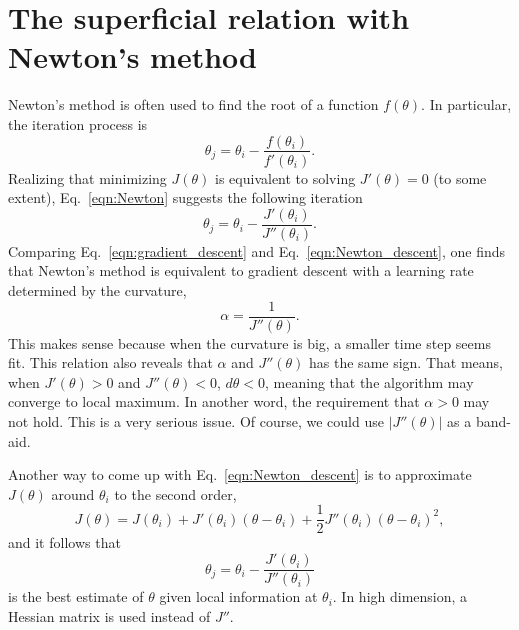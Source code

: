 \section{The superficial relation with Newton's method}
Newton's method is often used to find the root of a function $f(\theta)$. In particular, the iteration process is
\begin{equation}
\theta_j = \theta_i - \frac{f(\theta_i)}{f'(\theta_i)}.\label{eqn:Newton}
\end{equation}
Realizing that minimizing $J(\theta)$ is equivalent to solving $J'(\theta) = 0$ (to some extent), Eq.~\ref{eqn:Newton} suggests the following iteration
\begin{equation}
\theta_j = \theta_i - \frac{J'(\theta_i)}{J''(\theta_i)}.\label{eqn:Newton_descent}
\end{equation}
Comparing Eq.~\ref{eqn:gradient_descent} and Eq.~\ref{eqn:Newton_descent}, one finds that Newton's method is equivalent to gradient descent with a learning rate determined by the curvature,
\begin{equation}
\alpha = \frac{1}{J''(\theta)}.
\end{equation}
This makes sense because when the curvature is big, a smaller time step seems fit. This relation also reveals that $\alpha$ and $J''(\theta)$ has the same sign. That means, when $J'(\theta)>0$ and $J''(\theta)<0$, $d\theta<0$, meaning that the algorithm may converge to local maximum. In another word, the requirement that $\alpha > 0$ may not hold. This is a very serious issue. Of course, we could use $|J''(\theta)|$ as a band-aid. 

Another way to come up with Eq.~\ref{eqn:Newton_descent} is to approximate $J(\theta)$ around $\theta_i$ to the second order,
\begin{equation}
J(\theta) = J(\theta_i) + J'(\theta_i)(\theta-\theta_i) + \frac{1}{2}J''(\theta_i)(\theta-\theta_i)^2,
\end{equation}
and it follows that
\begin{equation}
\theta_j = \theta_i - \frac{J'(\theta_i)}{J''(\theta_i)}
\end{equation}
is the best estimate of $\theta$ given local information at $\theta_i$. In high dimension, a Hessian matrix is used instead of $J''$.

